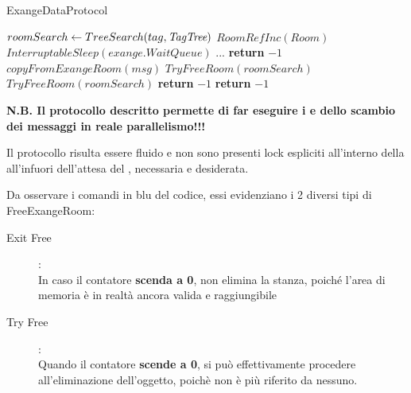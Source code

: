 \begin{algorithm}
\caption{\Reader ExangeDataProtocol}\label{readExange}
\begin{algorithmic}[1]
\State $roomSearch \gets TreeSearch(tag, \textit{TagTree})$
    \State $RoomRefInc(Room)$
        \State $InterruptableSleep(exange.WaitQueue)$
        \State ...
                \State \textbf{return} $-1$
            \EndIf
        \State $copyFromExangeRoom(msg)$ 
        \State $TryFreeRoom(roomSearch)$
    \Else
        \State $TryFreeRoom(roomSearch)$
        \State \textbf{return} $-1$
    \EndIf
\Else
    \State \textbf{return} $-1$
\EndIf
\EndProcedure
\end{algorithmic}
\end{algorithm}

\textbf{N.B. Il protocollo descritto permette di far eseguire i \Writer e \Reader dello scambio dei messaggi in reale
parallelismo!!!}

Il protocollo risulta essere fluido e non sono presenti lock espliciti all'interno della \exangeRoom all'infuori
dell'attesa del \Reader, necessaria e desiderata.

Da osservare i comandi in {\color{blue} blu} del codice, essi evidenziano i 2 diversi tipi di FreeExangeRoom:
\begin{description}
\item[Exit Free]:\\
In caso il contatore \textbf{scenda a 0}, non elimina la stanza, poiché l'area di memoria è in realtà ancora valida e
raggiungibile
\item[Try Free]:\\
Quando il contatore \textbf{scende a 0}, si può effettivamente procedere all'eliminazione dell'oggetto, poichè non è più
riferito da nessuno.
\end{description}

